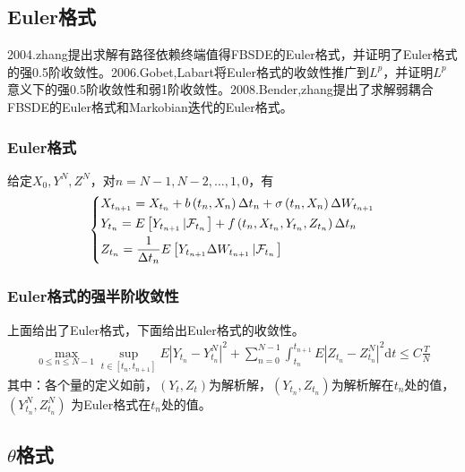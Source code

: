 	\subsection{Euler格式}
		\par
		2004.zhang\cite{2004.zhang}提出求解有路径依赖终端值得FBSDE的Euler格式，并证明了Euler格式的强0.5阶收敛性。2006.Gobet,Labart\cite{2006.Gobet}将Euler格式的收敛性推广到$L^p$，并证明$L^p$意义下的强0.5阶收敛性和弱1阶收敛性。2008.Bender,zhang\cite{2008.Bender}提出了求解弱耦合FBSDE的Euler格式和Markobian迭代的Euler格式。
		\subsubsection{Euler格式}
			给定$X_0,Y^N,Z^N$，对$n=N-1,N-2,\ldots,1,0$，有
				\begin{equation*}
				\centering
				\left\{\begin{lgathered}
				{{X_{{t_{n + 1}}}} = {X_{{t_n}}} + b\left( {{t_n},{X_n}} \right)\Delta {t_n} + \sigma \left( {{t_n},{X_n}} \right)\Delta {W_{{t_{n + 1}}}}}\\
				{{Y_{{t_n}}} = E\left[ {{Y_{{t_{n + 1}}}}\left| {{{\mathcal{F}}_{{t_n}}}} \right.} \right] + f\left( {{t_n},{X_{{t_n}}},{Y_{{t_n}}},{Z_{{t_n}}}} \right)\Delta {t_n}}\\
				{{Z_{{t_n}}} = \frac{1}{{\Delta {t_n}}}E\left[ {{Y_{{t_{n + 1}}}}\Delta {W_{{t_{n + 1}}}}\left| {{\mathcal{F}}_{{t_n}}} \right.} \right]}
				\end{lgathered} \right.
				\end{equation*}
		\subsubsection{Euler格式的强半阶收敛性}
			上面给出了Euler格式，下面给出Euler格式的收敛性。
			\begin{align*}
			\mathop {\max }\limits_{0 \leqslant n \leqslant {N -1 }} \mathop {\sup }\limits_{t \in \left[ {{t_n},{t_{n + 1}}} \right]} E{\left| {{Y_{{t_n}}} - Y_{{t_n}}^N} \right|^2} + \sum\limits_{n = 0}^{N - 1} {\int_{{t_n}}^{{t_{n + 1}}} {E{{\left| {{Z_{{t_n}}} - Z_{{t_n}}^N} \right|}^2}\mathrm{d}t \leqslant C\frac{T}{N}} } \end{align*}
			其中：各个量的定义如前，$(Y_t,Z_t)$为解析解，$(Y_{t_n},Z_{t_n})$为解析解在$t_n$处的值，$(Y_{t_n}^N,Z_{t_n}^N)$ 为Euler格式在$t_n$处的值。

	\subsection{$\theta$格式}
